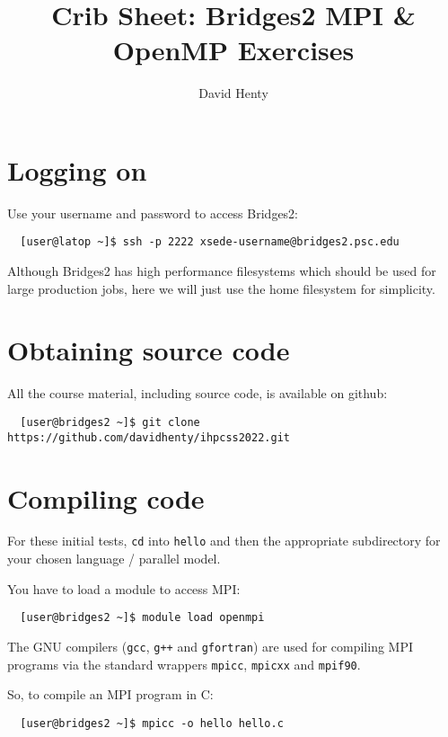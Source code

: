 \documentclass{article}
\begin{document}
\title{Crib Sheet: Bridges2 MPI \& OpenMP Exercises}

\author{David Henty}
\date{}
\makeEPCCtitle


\section{{\label{sec:access}}Logging on}

Use your username and password to access Bridges2:
\begin{verbatim}
  [user@latop ~]$ ssh -p 2222 xsede-username@bridges2.psc.edu
\end{verbatim}

Although Bridges2 has high performance filesystems which should be
used for large production jobs, here we will just use the home
filesystem for simplicity.

\section{Obtaining source code}

All the course material, including source code, is available on github:

\begin{verbatim}
  [user@bridges2 ~]$ git clone https://github.com/davidhenty/ihpcss2022.git
\end{verbatim}

\section{Compiling code}

For these initial tests, \texttt{cd} into \texttt{hello} and then the
appropriate subdirectory for your chosen language / parallel model.

You have to load a module to access MPI:

\begin{verbatim}
  [user@bridges2 ~]$ module load openmpi
\end{verbatim}

The GNU compilers (\texttt{gcc}, \texttt{g++} and \texttt{gfortran}) are
used for compiling MPI programs via the standard wrappers
\texttt{mpicc}, \texttt{mpicxx} and \texttt{mpif90}.

So, to compile an MPI program in C:

\begin{verbatim}
  [user@bridges2 ~]$ mpicc -o hello hello.c
\end{verbatim}
\end{document}
